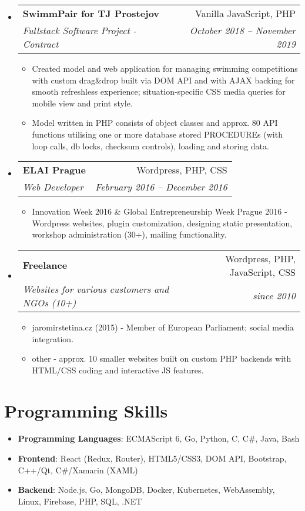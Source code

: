 \documentclass[letterpaper,11pt]{article}
\makeatletter
\newcommand{\sitem}[1]{\item #1 \vspace{-2pt}}
\newcommand{\resumeSubheading}[4]{
  \vspace{-1pt}\item
    \begin{tabular*}{0.97\textwidth}[t]{l@{\extracolsep{\fill}}r}
      \textbf{#1} & #2 \\
      \textit{\small#3} & \textit{\small #4} \\
    \end{tabular*}\vspace{-5pt}
}
\newenvironment{subheadingListing}{\begin{itemize}[leftmargin=*]}{\end{itemize}}
\newenvironment{resumeList}{\begin{itemize}}{\end{itemize}\vspace{-5pt}}
\newcommand{\CC}{C\nolinebreak\hspace{-.05em}\raisebox{.4ex}{\tiny\bf +}\nolinebreak\hspace{-.10em}\raisebox{.4ex}{\tiny\bf +}}
\makeatother
\begin{document}
\begin{subheadingListing}
  \resumeSubheading
  {SwimmPair for TJ Prostejov}{Vanilla JavaScript, PHP}%
  {Fullstack Software Project - Contract}{October 2018 – November 2019}
  \begin{resumeList}
    \sitem{Created model and web application for managing swimming competitions with custom drag\&drop built via DOM API and with AJAX backing for smooth refreshless experience; situation-specific CSS media queries for mobile view and print style.}
    \sitem{Model written in PHP consists of object classes and approx. 80 API functions utilising one or more database stored PROCEDUREs (with loop calls, db locks, checksum controls), loading and storing data.}
  \end{resumeList}

  \resumeSubheading
  {ELAI Prague}{Wordpress, PHP, CSS}
  {Web Developer}{February 2016 – December 2016}
  \begin{resumeList}
    \sitem{Innovation Week 2016 \& Global Entrepreneurship Week Prague 2016 - Wordpress websites, plugin customization, designing static presentation, workshop administration (30+), mailing functionality.}
 \end{resumeList}

  \resumeSubheading
  {Freelance}{Wordpress, PHP, JavaScript, CSS}
  {Websites for various customers and NGOs (10+)}{since 2010}
  \begin{resumeList}
    \sitem{jaromirstetina.cz (2015) - Member of European Parliament; social media integration.}
    \sitem{other - approx. 10 smaller websites built on custom PHP backends with HTML/CSS coding and interactive JS features.}  
  \end{resumeList}

\end{subheadingListing}


\section{Programming Skills}
\begin{subheadingListing}
  \sitem{
    \textbf{Programming Languages}{: ECMAScript 6, Go, Python, \CC, C\#, Java, Bash}
  }
  \sitem{
    \textbf{Frontend}{: React (Redux, Router), HTML5/CSS3, DOM API, Bootstrap, C++/Qt, C\#/Xamarin (XAML)}
  }
  \sitem{
    \textbf{Backend}{: Node.js, Go, MongoDB, Docker, Kubernetes, WebAssembly, Linux, Firebase, PHP, SQL, .NET}
  }
\end{subheadingListing}
\end{document}
